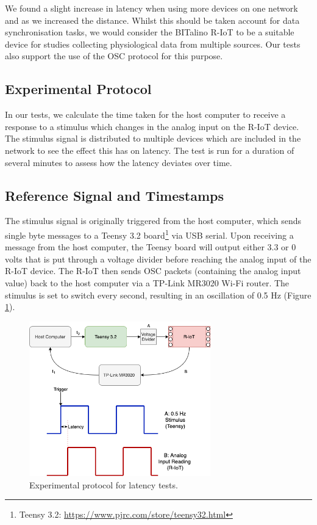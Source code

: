 We found a slight increase in latency when using more devices on one network and as we increased the distance. Whilst this should be taken account for data synchronisation tasks, we would consider the BITalino R-IoT to be a suitable device for studies collecting physiological data from multiple sources. Our tests also support the use of the OSC protocol for this purpose.

\subsection*{Experimental Protocol}

In our tests, we calculate the time taken for the host computer to receive a response to a stimulus which changes in the analog input on the R-IoT device. The stimulus signal is distributed to multiple devices which are included in the network to see the effect this has on latency. The test is run for a duration of several minutes to assess how the latency deviates over time.

\subsection*{Reference Signal and Timestamps}
The stimulus signal is originally triggered from the host computer, which sends single byte messages to a Teensy 3.2 board\footnote{Teensy 3.2: \url{https://www.pjrc.com/store/teensy32.html}} via USB serial. Upon receiving a message from the host computer, the Teensy board will output either 3.3 or 0 volts that is put through a voltage divider before reaching the analog input of the R-IoT device. The R-IoT then sends OSC packets (containing the analog input value) back to the host computer via a TP-Link MR3020 Wi-Fi router. The stimulus is set to switch every second, resulting in an oscillation of 0.5 Hz (Figure \ref{fig:latency_fig1}).

\begin{figure}[htbp]
  \centering
    \includegraphics[width=0.7\textwidth]{Chapters/Figures/technical/Latency/figure1.png}
    \caption{Experimental protocol for latency tests.}
    \label{fig:latency_fig1}
\end{figure}

